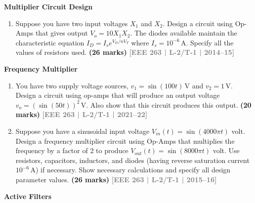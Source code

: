 \documentclass[12pt,a3paper]{article}
\newcommand{\yr}[1]{\hfill\textcolor{gray}{\small\textbf{[#1]}}}
\newcommand{\mk}[1]{\textcolor{orange!70!black}{\small\textbf{(#1 marks)}}}
\newcommand{\subtopic}[2]{%
  \vspace{10pt}
  \noindent\begin{tcolorbox}[colback=#1!8,colframe=#1,boxrule=0.6pt,arc=4pt,
    left=6pt,right=6pt,top=4pt,bottom=4pt]
    \small\bfseries\textcolor{#1}{#2}
  \end{tcolorbox}
  \vspace{2pt}
}
\begin{document}
\subtopic{cE}{Multiplier Circuit Design}
\label{sub:s7-mult}

\begin{enumerate}\item Suppose you have two input voltages $X_1$ and $X_2$. Design a circuit using Op-Amps that gives output $V_o = 10X_1 X_2$. The diodes available maintain the characteristic equation $I_D = I_s e^{V_D/nV_T}$ where $I_s = 10^{-6}\,\text{A}$. Specify all the values of resistors used.
\mk{26} \yr{EEE 263 | L-2/T-1 | 2014--15}

\end{enumerate}

\subtopic{cE}{Frequency Multiplier}
\label{sub:s7-freqmult}

\begin{enumerate}\item You have two supply voltage sources, $v_1 = \sin(100t)\,\text{V}$ and $v_2 = 1\,\text{V}$. Design a circuit using op-amps that will produce an output voltage $v_o = (\sin(50t))^2\,\text{V}$. Also show that this circuit produces this output.
\mk{20} \yr{EEE 263 | L-2/T-1 | 2021--22}

\item Suppose you have a sinusoidal input voltage $V_{in}(t) = \sin(4000\pi t)$ volt. Design a frequency multiplier circuit using Op-Amps that multiplies the frequency by a factor of 2 to produce $V_{out}(t) = \sin(8000\pi t)$ volt. Use resistors, capacitors, inductors, and diodes (having reverse saturation current $10^{-6}\,\text{A}$) if necessary. Show necessary calculations and specify all design parameter values.
\mk{26} \yr{EEE 263 | L-2/T-1 | 2015--16}

\end{enumerate}

\subtopic{cE}{Active Filters}
\label{sub:s7-filters}
\end{document}
